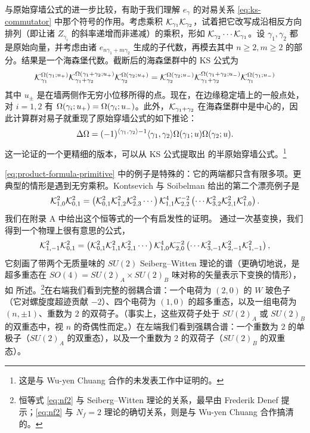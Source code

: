 与原始穿墙公式的进一步比较，有助于我们理解 $e_\gamma$ 的对易关系 \eqref{eq:ks-commutator} 中那个符号的作用。考虑乘积 $\mathcal{K}_{\gamma_1} \mathcal{K}_{\gamma_2}$，试着把它改写成沿相反方向排列（即让诸 $Z_{\gamma_i}$ 的斜率递增而非递减）的乘积，形如 $\mathcal{K}_{\gamma_2} \cdots \mathcal{K}_{\gamma_1}$。设 $\gamma_1,\gamma_2$ 都是原始向量，并考虑由诸 $e_{n\gamma_1 + m \gamma_2}$ 生成的子代数，再模去其中 $n\geq 2, m\geq 2$ 的部分。结果是一个海森堡代数。截断后的海森堡群中的 KS 公式为
\begin{equation}
\mathcal{K}_{\gamma_1}^{\Omega(\gamma_1;u_+)}\mathcal{K}_{\gamma_1+\gamma_2}^{\Omega(\gamma_1+\gamma_2;u_+)}
\mathcal{K}_{\gamma_2}^{\Omega(\gamma_2;u_+)}=
\mathcal{K}_{\gamma_2}^{\Omega(\gamma_2;u_-)}\mathcal{K}_{\gamma_1+\gamma_2}^{\Omega(\gamma_1+\gamma_2;u_-)}
\mathcal{K}_{\gamma_1}^{\Omega(\gamma_1;u_-)}
\end{equation}
其中 $u_\pm$ 是在墙两侧作无穷小位移所得的点。现在，在边缘稳定墙上的一般点处，对 $i=1,2$ 有 $\Omega(\gamma_i; u_+) = \Omega(\gamma_i; u_-)$。此外，$\mathcal{K}_{\gamma_1+\gamma_2}$ 在海森堡群中是中心的，因此计算群对易子就重现了原始穿墙公式的如下推论：
\begin{equation}
\Delta \Omega = (-1)^{\langle \gamma_1,\gamma_2\rangle -1} \langle
\gamma_1,\gamma_2\rangle \Omega(\gamma_1;u) \Omega(\gamma_2;u).
\end{equation}
这一论证的一个更精细的版本，可以从 KS 公式提取出 \cite{Denef:2007vg} 的半原始穿墙公式。\footnote{这是与 Wu-yen Chuang 合作的未发表工作中证明的。}

\eqref{eq:product-formula-primitive} 中的例子是特殊的：它的两端都只含有限多项。更典型的情形是遇到无穷乘积。Kontsevich 与 Soibelman 给出的第二个漂亮例子是
\begin{equation}
\mathcal{K}_{1,0}^2 \mathcal{K}_{0,1}^2 = \left( \mathcal{K}_{0,1}^2 \mathcal{K}_{1,2}^2 \mathcal{K}_{2,3}^2 \cdots \right)
\mathcal{K}_{1,1}^{4} \mathcal{K}_{2,2}^{-2} \left( \cdots \mathcal{K}_{3,2}^2 \mathcal{K}_{2,1}^2 \mathcal{K}_{1,0}^2 \right).
\end{equation}
我们在附录 A 中给出这个恒等式的一个有启发性的证明。%
通过一次基变换，我们得到一个物理上很有意思的公式，
\begin{equation} \label{eq:nf2}
\mathcal{K}_{1,-1}^2 \mathcal{K}_{0,1}^2 = \left( \mathcal{K}_{0,1}^2 \mathcal{K}_{1,1}^2 \mathcal{K}_{2,1}^2 \cdots \right) \mathcal{K}_{1,0}^4 \mathcal{K}_{2,0}^{-2}
\left( \cdots \mathcal{K}_{3,-1}^2 \mathcal{K}_{2,-1}^2 \mathcal{K}_{1,-1}^2 \right),
\end{equation}
它刻画了带两个无质量味的 $SU(2)$ Seiberg--Witten 理论的谱（更确切地说，是超多重态在 $SO(4)=SU(2)_A \times SU(2)_B$ 味对称的矢量表示下变换的情形），如 \cite{Bilal:1996sk} 所述。\footnote{恒等式 \eqref{eq:nf2} 与 Seiberg--Witten 理论的关系，最早由 Frederik Denef 提示；\eqref{eq:nf2} 与 $N_f=2$ 理论的确切关系，则是与 Wu-yen Chuang 合作搞清的。}在右端我们看到完整的弱耦合谱：一个电荷为 $(2,0)$ 的 $W$ 玻色子（它对螺旋度超迹贡献 $-2$）、四个电荷为 $(1,0)$ 的超多重态，以及一组电荷为 $(n,\pm 1)$、重数为 $2$ 的双荷子。（事实上，这些双荷子处于 $SU(2)_A$ 或 $SU(2)_B$ 的双重态中，视 $n$ 的奇偶性而定。）在左端我们看到强耦合谱：一个重数为 $2$ 的单极子（$SU(2)_A$ 的双重态），以及一个重数为 $2$ 的双荷子（$SU(2)_B$ 的双重态）。


